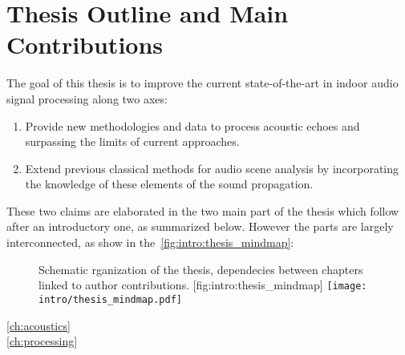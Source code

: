 %



\section{Thesis Outline and Main Contributions}
The goal of this thesis is to improve the current state-of-the-art in indoor audio signal processing along two axes:
\begin{enumerate}
    \item Provide new methodologies and data to process acoustic echoes and surpassing the limits of current approaches.
    \item Extend previous classical methods for audio scene analysis by incorporating the knowledge of these elements of the sound propagation.
\end{enumerate}

\mynewline
These two claims are elaborated in the two main part of the thesis which follow after an introductory one, as summarized below.
However the parts are largely interconnected, as show in the~\cref{fig:intro:thesis_mindmap}:

\begin{figure}[t]
    \begin{sidecaption}{%
        Schematic rganization of the thesis, dependecies between chapters linked to author contributions.
    }[fig:intro:thesis_mindmap]
    \centering
    \texttt{[image: intro/thesis\_mindmap.pdf]}
    \end{sidecaption}
\end{figure}


\begin{description}
    \item[\cref{ch:acoustics}]\synopsisChAcoustics
    \item[\cref{ch:processing}]\synopsisChProcessing
\end{description}

